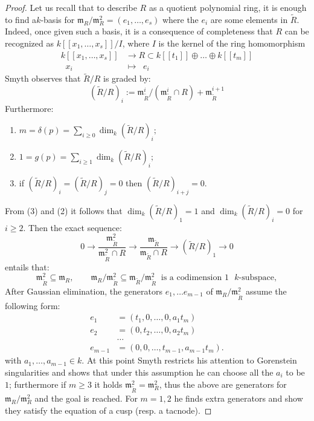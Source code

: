 \documentclass[11pt]{amsart}
\renewcommand{\to}{\rightarrow}
\theoremstyle{plain}
\theoremstyle{definition}
\begin{document}
\begin{proof}
Let us recall that to describe $R$ as a quotient polynomial ring, it is enough to find a$k$-basis for $\mathfrak{m}_R/\mathfrak{m}^2_R=(e_1,\ldots, e_s)$ where the $e_i$ are some elements in $\widetilde{R}.$ Indeed, once given such a basis, it is a consequence of completeness that $R$ can be recognized as $k[[x_1,\ldots, x_s]]/I$, where $I$ is the kernel of the ring homomorphism
\begin{align*}\label{eq:singularity}
k[[x_1,\ldots, x_s]]&\rightarrow R\subset k[[t_1]]\oplus\dots\oplus k[[t_m]]\\
\;\;x_i\;\; &\mapsto \;\; e_i\;\;
\end{align*}
Smyth observes that $\widetilde R/R$ is graded by:
\[ (\widetilde R/R)_i:=\mathfrak m_{\widetilde R}^i/(\mathfrak m_{\widetilde R}^i\cap R)+\mathfrak m_{\widetilde R}^{i+1}\]
Furthermore:
\begin{enumerate}
\item $m=\delta(p)=\sum_{i\geq 0}\dim_k(\widetilde R/R)_i;$
\item $1=g(p)=\sum_{i\geq 1}\dim_k(\widetilde R/R)_i;$
\item if $(\widetilde R/R)_i=(\widetilde R/R)_j=0$ then $(\widetilde R/R)_{i+j}=0$.
\end{enumerate}
From (3) and (2) it follows that $\dim_k(\widetilde R/R)_1=1$ and $\dim_k(\widetilde R/R)_i=0$ for $i\geq 2$. Then the exact sequence:
\[ 0\to \frac{\mathfrak m_{\widetilde R}^2}{\mathfrak m_{\widetilde R}^2\cap R}\to\frac{\mathfrak m_{\widetilde R}}{\mathfrak m_{\widetilde R}\cap R}\to (\widetilde R/R)_1\to 0\]
entails that:
\[\mathfrak{m}^2_{\widetilde{R}}\subseteq \mathfrak m_R,\qquad \mathfrak{m}_R/\mathfrak{m}^2_{\widetilde{R}}\subseteq \mathfrak{m}_{\widetilde{R}}/\mathfrak{m}^2_{\widetilde{R}}\;\;\text{is a codimension $1$ $k$-subspace},\]
After Gaussian elimination, the generators $e_1,\dots e_{m-1}$ of $\mathfrak{m}_R/\mathfrak{m}^2_{\widetilde{R}}$ assume the following form:
\begin{align*}
e_1&= (t_1, 0, \ldots, 0, a_1 t_m) \\
e_2&= (0, t_2, \ldots, 0, a_2 t_m) \\
 & \ldots \\
e_{m-1} &= (0, 0,\ldots, t_{m-1}, a_{m-1}t_m).
\end{align*}
with $a_{1}, \ldots, a_{m-1}\in k.$ At this point Smyth restricts his attention to Gorenstein singularities and shows that under this assumption he can choose all the $a_i$ to be $1$; furthermore if $m\geq 3$ it holds $\mathfrak{m}^2_{\widetilde{R}}=\mathfrak{m}^2_{R}$, thus the above are generators for $\mathfrak{m}_R/\mathfrak{m}^2_R$ and the goal is reached. For $m=1,2$ he finds extra generators and show they satisfy the equation of a cusp (resp. a tacnode).


\end{proof}
\end{document}

